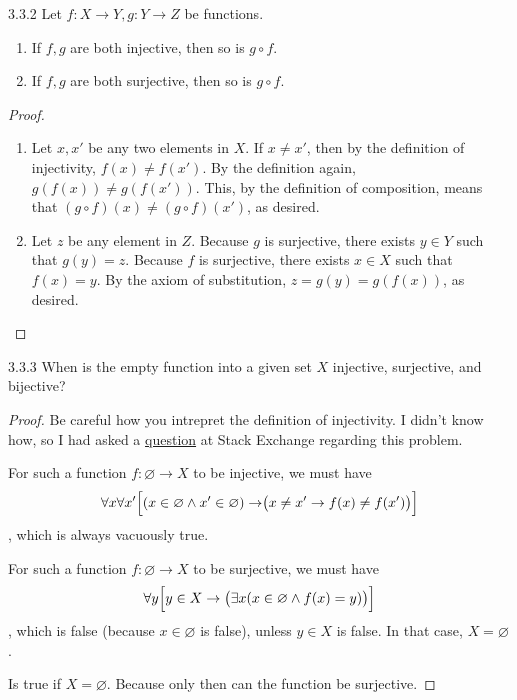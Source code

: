 \begin{exercise}{3.3.2}
	Let $f: X \to Y, g: Y \to Z$ be functions.
	\begin{enumerate}
		\item If $f,g$ are both injective, then so is $g \circ f$.
		\item If $f,g$ are both surjective, then so is $g \circ f$.
	\end{enumerate}
\end{exercise}
\begin{proof}\leavevmode
	\begin{enumerate}
		\item Let $x, x'$ be any two elements in $X$. If $x \ne x'$, then by the definition of injectivity, $f(x) \ne f(x')$. By the definition again,
		$g(f(x)) \ne g(f(x'))$. This, by the definition of composition, means that $(g \circ f)(x) \ne (g \circ f)(x')$, as desired.
		
		\item Let $z$ be any element in $Z$. Because $g$ is surjective, there exists $y \in Y$ such that $g(y) = z$. Because $f$ is surjective, there exists $x \in X$ such that $f(x) = y$. 
		By the axiom of substitution, $z = g(y) = g(f(x))$, as desired.
	\end{enumerate}
\end{proof}

\begin{exercise}{3.3.3}
	When is the empty function into a given set $X$ injective, surjective, and bijective?
\end{exercise}
\begin{proof}
	Be careful how you intrepret the definition of injectivity. I didn't know how, so I had asked a \href{https://math.stackexchange.com/questions/3800240/how-to-interpret-the-definition-of-injectivity}{question} at Stack Exchange regarding this problem.

	 For such a function $f: \varnothing \to X$ to be injective, we must have
	\[
	\forall x \forall x'\Bigl[(x \in \varnothing \wedge x' \in \varnothing) \to \bigr(x \ne x' \to f(x) \ne f(x')\bigl)\Bigr]
	\]
	, which is always vacuously true.
	
	 For such a function $f: \varnothing \to X$ to be surjective, we must have
	\[
	\forall y\Bigl[y \in X \to \bigl(\exists x(x \in \varnothing \wedge f(x) = y)\bigr)\Bigr]
	\]
	, which is false (because $x \in \varnothing$ is false), unless $y \in X$ is false. In that case, $X = \varnothing$.
	
	 Is true if $X = \varnothing$. Because only then can the function be surjective.
\end{proof}

